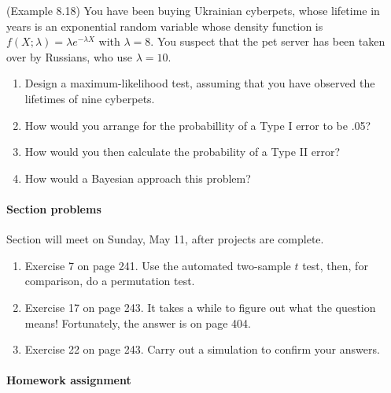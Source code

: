 \documentclass[12pt]{article}
\begin{document}
\begin{enumerate}
(Example 8.18) You have been buying Ukrainian cyberpets, whose lifetime in years is an exponential random variable whose density function is\\ $f(X; \lambda) = \lambda e^{- \lambda X}$ with $\lambda = 8$. You suspect that the pet server has been taken over by Russians, who use $\lambda = 10$.

\begin{enumerate}
\item Design a maximum-likelihood test, assuming that you have observed the lifetimes of nine cyberpets.

\item How would you arrange for the probabillity of a Type I error to be .05?

\item How would you then calculate the probability of a Type II error?

\item How would a Bayesian approach this problem?

\end{enumerate}





\end{enumerate}

\pagebreak


\paragraph*{Section problems}

Section will meet on Sunday, May 11, after projects are complete.
\begin{enumerate}
\item Exercise 7 on page 241. Use the automated two-sample $t$ test, then, for comparison, do a permutation test.

\item Exercise 17 on page 243. It takes a while to figure out what the question means! Fortunately, the answer is on page 404.

\item Exercise 22 on page 243. Carry out a simulation to confirm your answers.
\end{enumerate}

\pagebreak


\paragraph*{Homework assignment}
\end{document}
